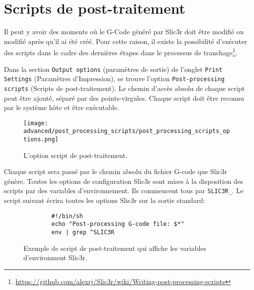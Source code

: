 
\section{Scripts de post-traitement} %
\label{sec:post_processing_scripts}

Il peut y avoir des moments o\`u le G-Code g\'en\'er\'e par Slic3r doit \^etre modifi\'e ou modifi\'e apr\`es qu'il ai \'et\'e cr\'e\'e. Pour cette raison, il existe la possibilit\'e d'ex\'ecuter des scripts dans le cadre des derni\`eres \'etapes dans le processus de tranchage\footnote{\url{https://github.com/alexrj/Slic3r/wiki/Writing-post-processing-scripts}}.

Dans la section \texttt{Output options} (param\`etres de sortie) de l'onglet \texttt{Print Settings} (Param\`etres d'Impression), se trouve l'option \texttt{Post-processing scripts} (Scripts de post-traitement).  Le chemin d'acc\`es absolu de chaque script peut \^etre ajout\'e, s\'epar\'e par des points-virgules. Chaque script doit \^etre reconnu par le syst\`eme h\^ote et \^etre ex\'ecutable.

\begin{figure}[H]
\centering
\texttt{[image: advanced/post\_processing\_scripts/post\_processing\_scripts\_options.png]}
\caption{L'option script de post-traitement.}
\label{fig:post_processing_scripts_options}
\end{figure}

Chaque script sera pass\'e par le chemin absolu du fichier G-code que Slic3r g\'en\`ere. Toutes les options de configuration Slic3r sont mises \`a la disposition des scripts par des variables d'environnement.  Ils commencent tous par \texttt{SLIC3R\_}.  Le script suivant \'ecrira toutes les options Slic3r sur la sortie standard:

\begin{figure}[H]
\small
\begin{verbatim}
        #!/bin/sh
        echo "Post-processing G-code file: $*"
        env | grep ^SLIC3R
\end{verbatim}
\caption{Exemple de script de post-traitement qui affiche les variables d'environment Slic3r.}
\label{fig:exaple_post_processing_script_env_vars}
\end{figure}

